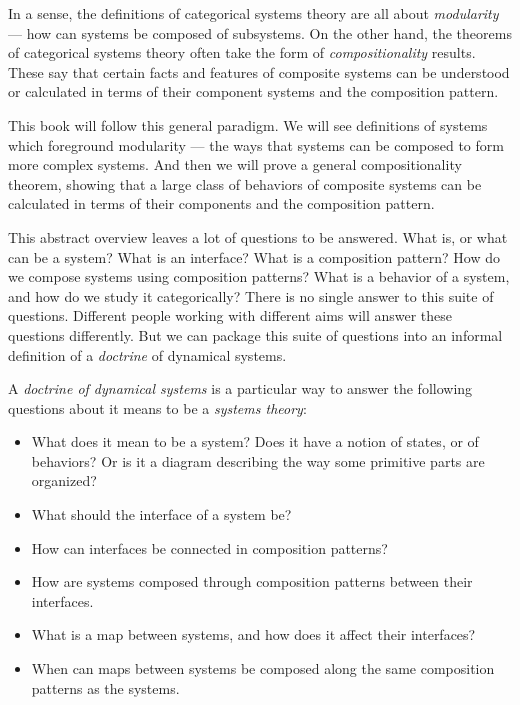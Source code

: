\documentclass[DynamicalBook]{subfiles}
\begin{document}
In a sense, the definitions of categorical systems theory are all about \emph{modularity} --- how can systems be composed of subsystems. On the other hand, the theorems of categorical systems theory often take the form of \emph{compositionality} results. These say that certain facts and features of composite systems can be understood or calculated in terms of their component systems and the composition pattern.

This book will follow this general paradigm. We will see definitions of systems which foreground modularity --- the ways that systems can be composed to form more complex systems. And then we will prove a general compositionality theorem, showing that a large class of behaviors of composite systems can be calculated in terms of their components and the composition pattern.

This abstract overview leaves a lot of questions to be answered. What is, or what can be a system? What is an interface? What is a composition pattern? How do we compose systems using composition patterns? What is a behavior of a system, and how do we study it categorically? There is no single answer to this suite of questions. Different people working with different aims will answer these questions differently. But we can package this suite of questions into an informal definition of a \emph{doctrine} of dynamical systems.

\begin{informal}\label{informal:paradigm}
 A \emph{doctrine of dynamical systems} is a particular way to answer the following questions about it means to be a \emph{systems theory}:
 \begin{itemize}
   \item What does it mean to be a system? Does it have a notion of states, or of behaviors? Or is it a diagram describing the way some primitive parts are organized?
   \item What should the interface of a system be?
   \item How can interfaces be connected in composition patterns?
  \item How are systems composed through composition patterns between their interfaces.
  \item What is a map between systems, and how does it affect their interfaces?
  \item When can maps between systems be composed along the same composition patterns as the systems.
  \end{itemize}
  \end{informal}
\end{document}
